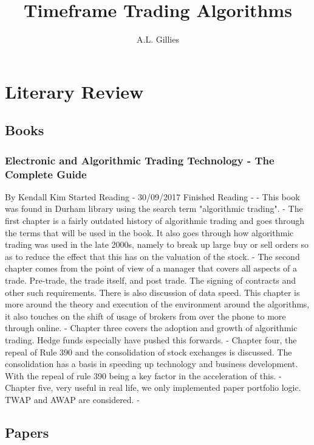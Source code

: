 \documentclass[12pt,a4paper]{article}
\title{Timeframe Trading Algorithms}
\author{A.L. Gillies}
\date{}
\begin{document}
\maketitle

\section*{Literary Review}

\subsection*{Books}

\subsubsection*{Electronic and Algorithmic Trading Technology - The Complete Guide}
By Kendall Kim \newline
Started Reading - 30/09/2017 \newline
Finished Reading -  \newline
\newline
- This book was found in Durham library using the search term "algorithmic trading". \newline
- The first chapter is a fairly outdated history of algorithmic trading and goes through the terms that will be used in the book. It also goes through how algorithmic trading was used in the late 2000s, namely to break up large buy or sell orders so as to reduce the effect that this has on the valuation of the stock. \newline
- The second chapter comes from the point of view of a manager that covers all aspects of a trade. Pre-trade, the trade itself, and post trade. The signing of contracts and other such requirements. There is also discussion of data speed. This chapter is more around the theory and execution of the environment around the algorithms, it also touches on the shift of usage of brokers from over the phone to more through online. \newline
- Chapter three covers the adoption and growth of algorithmic trading. Hedge funds especially have pushed this forwards. \newline
- Chapter four, the repeal of Rule 390 and the consolidation of stock exchanges is discussed. The consolidation has a basis in speeding up technology and business development. With the repeal of rule 390 being a key factor in the acceleration of this. \newline
- Chapter five, very useful in real life, we only implemented paper portfolio logic. TWAP and AWAP are considered. \newline
-

\subsection*{Papers}
\end{document}
